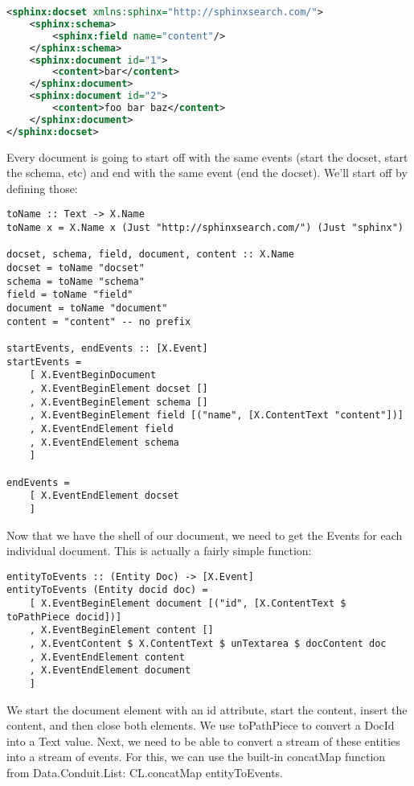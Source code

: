 \begin{lstlisting}[language=XML]
<sphinx:docset xmlns:sphinx="http://sphinxsearch.com/">
    <sphinx:schema>
        <sphinx:field name="content"/>
    </sphinx:schema>
    <sphinx:document id="1">
        <content>bar</content>
    </sphinx:document>
    <sphinx:document id="2">
        <content>foo bar baz</content>
    </sphinx:document>
</sphinx:docset>
\end{lstlisting}

Every document is going to start off with the same events (start the docset, start the schema, etc) and end with the same event (end the docset). We'll start off by defining those:

\begin{lstlisting}
toName :: Text -> X.Name
toName x = X.Name x (Just "http://sphinxsearch.com/") (Just "sphinx")

docset, schema, field, document, content :: X.Name
docset = toName "docset"
schema = toName "schema"
field = toName "field"
document = toName "document"
content = "content" -- no prefix

startEvents, endEvents :: [X.Event]
startEvents =
    [ X.EventBeginDocument
    , X.EventBeginElement docset []
    , X.EventBeginElement schema []
    , X.EventBeginElement field [("name", [X.ContentText "content"])]
    , X.EventEndElement field
    , X.EventEndElement schema
    ]

endEvents =
    [ X.EventEndElement docset
    ]
\end{lstlisting}

Now that we have the shell of our document, we need to get the Events for each individual document. This is actually a fairly simple function:

\begin{lstlisting}
entityToEvents :: (Entity Doc) -> [X.Event]
entityToEvents (Entity docid doc) =
    [ X.EventBeginElement document [("id", [X.ContentText $ toPathPiece docid])]
    , X.EventBeginElement content []
    , X.EventContent $ X.ContentText $ unTextarea $ docContent doc
    , X.EventEndElement content
    , X.EventEndElement document
    ]
\end{lstlisting}

We start the document element with an id attribute, start the content, insert the content, and then close both elements. We use toPathPiece to convert a DocId into a Text value. Next, we need to be able to convert a stream of these entities into a stream of events. For this, we can use the built-in concatMap function from Data.Conduit.List: CL.concatMap entityToEvents.

